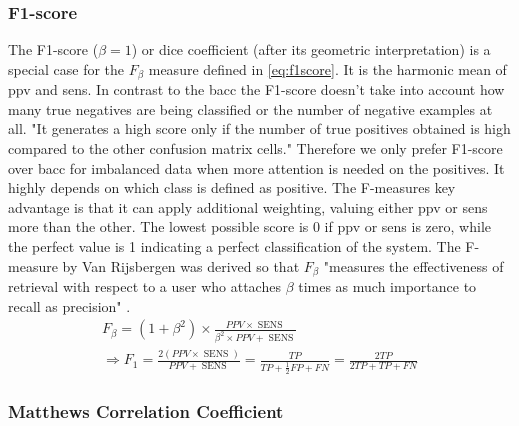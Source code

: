 \subsubsection{F1-score}

The F1-score (\(\beta = 1\)) or dice coefficient (after its geometric interpretation) is a special case for the \( F_\beta\) measure defined in \cref{eq:f1score}. It is the harmonic mean of \acrshort{ppv} and \acrshort{sens}. In contrast to the \acrshort{bacc} the F1-score doesn’t take into account how many true negatives are being classified or the number of negative examples at all. "It generates a high score only if the number of true positives obtained is high compared to the other confusion matrix cells." \cite{Hoffman.2020} Therefore we only prefer F1-score over \acrshort{bacc} for imbalanced data when more attention is needed on the positives. It highly depends on which class is defined as positive. The F-measures key advantage is that it can apply additional weighting, valuing either \acrshort{ppv} or \acrshort{sens} more than the other. The lowest possible score is 0 if \acrshort{ppv} or \acrshort{sens} is zero, while the perfect value is 1 indicating a perfect classification of the system. The F-measure by Van Rijsbergen was derived so that \( F_\beta \) "measures the effectiveness of retrieval with respect to a user who attaches \( \beta \) times as much importance to recall as precision" \cite{vanRijsbergen.1979}.
\begin{equation}
    \begin{gathered}
        F_\beta
        = (1 + \beta^2) \times \frac{PPV \times \operatorname{SENS}}{\beta^2 \times PPV + \operatorname{SENS}} \\
        \Rightarrow F_1
        = \frac{2(PPV \times \operatorname{SENS})}{PPV + \operatorname{SENS}}
        = \frac{TP}{TP + \frac{1}{2}FP + FN}
        = \frac{2TP}{2TP + TP + FN}
    \end{gathered}
    \label{eq:f1score}
\end{equation}

\subsubsection{Matthews Correlation Coefficient}

